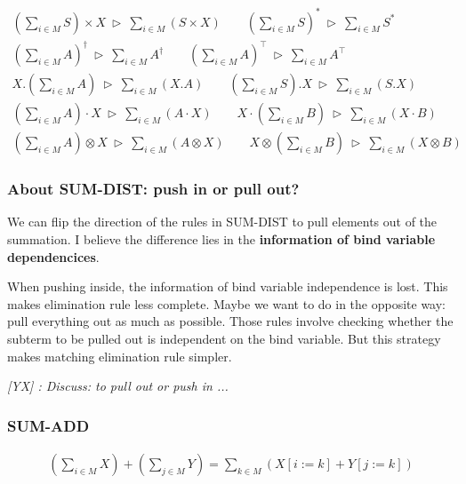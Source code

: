 \documentclass[manuscript, review, timestamp]{acmart}
\newcommand{\yx}[1]{\textit{\color{blue}[YX] : #1}}
\newcommand*{\reduce}{\ \triangleright\ }
\begin{document}
\begin{gather*}
  (\sum_{i \in M} S) \times X \reduce \sum_{i \in M} (S \times X)
  \qquad
  (\sum_{i \in M} S)^* \reduce \sum_{i \in M} S^* \\
  (\sum_{i \in M} A)^\dagger \reduce \sum_{i \in M} A^\dagger
  \qquad
  (\sum_{i \in M} A)^\top \reduce \sum_{i \in M} A^\top \\
  X.(\sum_{i \in M} A) \reduce \sum_{i \in M} (X.A)
  \qquad
  (\sum_{i \in M} S). X \reduce \sum_{i \in M} (S.X) \\
  (\sum_{i \in M} A) \cdot X \reduce \sum_{i \in M} (A \cdot X) 
  \qquad
  X \cdot (\sum_{i \in M} B) \reduce \sum_{i \in M} (X \cdot B) \\
  (\sum_{i \in M} A) \otimes X \reduce \sum_{i \in M} (A \otimes X) 
  \qquad
  X \otimes (\sum_{i \in M} B) \reduce \sum_{i \in M} (X \otimes B)
\end{gather*}

\subsubsection*{About \textsf{SUM-DIST}: push in or pull out?}
We can flip the direction of the rules in \textsf{SUM-DIST} to pull elements out of the summation. I believe the difference lies in the \textbf{information of bind variable dependencices}.

When pushing inside, the information of bind variable independence is lost. This makes elimination rule less complete. Maybe we want to do in the opposite way: pull everything out as much as possible. Those rules involve checking whether the subterm to be pulled out is independent on the bind variable. But this strategy makes matching elimination rule simpler.

\yx{Discuss: to pull out or push in ...}

\subsubsection*{SUM-ADD}
\begin{gather*}
  (\sum_{i \in M} X) + (\sum_{j \in M} Y) = \sum_{k \in M} (X[i:=k] + Y[j:=k])
\end{gather*}
\end{document}
